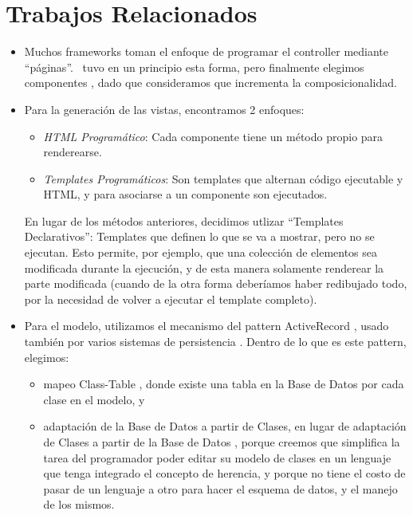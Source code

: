 \section{Trabajos Relacionados}

\begin{itemize}
\item Muchos frameworks toman el enfoque de programar el controller mediante ``páginas''\cite{cake, RoR}. \PWB\ tuvo en un principio esta forma, pero finalmente elegimos componentes \cite{seaside,Duca04e}, dado que consideramos que incrementa la composicionalidad.


\item Para la generación de las vistas, encontramos 2 enfoques:
\begin{itemize}
\item \emph{HTML Programático}: Cada componente tiene un método propio para renderearse.
\item \emph{Templates Programáticos}: Son templates que alternan código ejecutable y HTML, y para asociarse a un componente son ejecutados.
\end{itemize}
En lugar de los métodos anteriores, decidimos utlizar ``Templates Declarativos'': Templates que definen lo que se va a mostrar, pero no se ejecutan. Esto permite, por ejemplo, que una colección de elementos sea modificada durante la ejecución, y de esta manera solamente renderear la parte modificada (cuando de la otra forma deberíamos haber redibujado todo, por la necesidad de volver a ejecutar el template completo).


\item Para el modelo, utilizamos el mecanismo del pattern ActiveRecord \cite{activerecord}, usado también por varios sistemas de persistencia \cite{hibernate, RoR, glorp, cake}. Dentro de lo que es este pattern, elegimos:
\begin{itemize}
\item mapeo Class-Table \cite{classtable}, donde existe una tabla en la Base de Datos por cada clase en el modelo, y
\item adaptación de la Base de Datos a partir de Clases, en lugar de adaptación de Clases a partir de la Base de Datos \cite{RoR, cake}, porque creemos que simplifica la tarea del programador poder editar su modelo de clases en un lenguaje que tenga integrado el concepto de herencia, y porque no tiene el costo de pasar de un lenguaje a otro para hacer el esquema de datos, y el manejo de los mismos.
\end{itemize}


\end{itemize}
